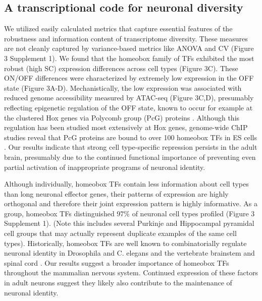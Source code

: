 \subsection{A transcriptional code for neuronal diversity}
We utilized easily calculated metrics that capture essential features of the robustness and information content of transcriptome diversity. These measures are not cleanly captured by variance-based metrics like ANOVA and CV (Figure 3 Supplement 1). We found that the homeobox family of TFs exhibited the most robust (high SC) expression differences across cell types (Figure 3C). These ON/OFF differences were characterized by extremely low expression in the OFF state (Figure 3A-D). Mechanistically, the low expression was associated with reduced genome accessibility measured by ATAC-seq (Figure 3C,D), presumably reflecting epigenetic regulation of the OFF state, known to occur for example at the clustered Hox genes via Polycomb group (PcG) proteins \citep{Montavon_2014}. Although this regulation has been studied most extensively at Hox genes, genome-wide ChIP studies reveal that PcG proteins are bound to over 100 homeobox TFs in ES cells \citep{Boyer_2006}. Our results indicate that strong cell type-specific repression persists in the adult brain, presumably due to the continued functional importance of preventing even partial activation of inappropriate programs of neuronal identity. 

Although individually, homeobox TFs contain less information about cell types than long neuronal effector genes, their patterns of expression are highly orthogonal and therefore their joint expression pattern is highly informative. As a group, homeobox TFs distinguished 97\% of neuronal cell types profiled (Figure 3 Supplement 1). (Note this includes several Purkinje and Hippocampal pyramidal cell groups that may actually represent duplicate examples of the same cell types). Historically, homeobox TFs are well known to combinatorially regulate neuronal identity in Drosophila and C. elegans \citep{Kratsios_2017} and the vertebrate brainstem and spinal cord \citep{Dasen_2009,Philippidou_2013}. Our results suggest a broader importance of homeobox TFs throughout the mammalian nervous system. Continued expression of these factors in adult neurons suggest they likely also contribute to the maintenance of neuronal identity.

